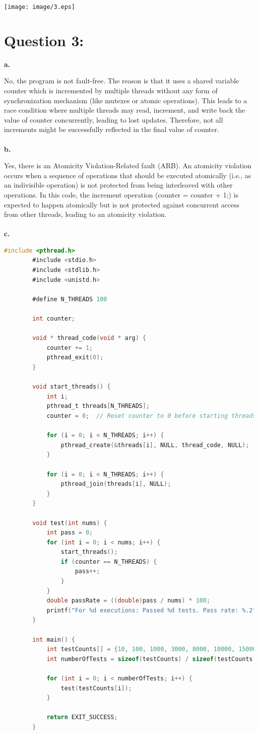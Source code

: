 \documentclass[12pt]{article}
\numberwithin{table}{section}
\begin{document}
	\begin{center}
		\texttt{[image: image/3.eps]}
	\end{center}
	
	
	\section*{Question 3: } 
	\textbf{a.}
	
	No, the program is not fault-free. The reason is that it uses a shared variable counter which is incremented by multiple threads without any form of synchronization mechanism (like mutexes or atomic operations). This leads to a race condition where multiple threads may read, increment, and write back the value of counter concurrently, leading to lost updates. Therefore, not all increments might be successfully reflected in the final value of counter.\\
	\\
	\textbf{b.}
	
	Yes, there is an Atomicity Violation-Related fault (ARB). An atomicity violation occurs when a sequence of operations that should be executed atomically (i.e., as an indivisible operation) is not protected from being interleaved with other operations. In this code, the increment operation (counter = counter + 1;) is expected to happen atomically but is not protected against concurrent access from other threads, leading to an atomicity violation.\\
	\\
	\textbf{c.}
	
	\begin{lstlisting}[language=C]
		#include <pthread.h>
		#include <stdio.h>
		#include <stdlib.h>
		#include <unistd.h>
		
		#define N_THREADS 100
		
		int counter;
		
		void * thread_code(void * arg) {
			counter += 1;
			pthread_exit(0);
		}
		
		void start_threads() {
			int i;
			pthread_t threads[N_THREADS];
			counter = 0;  // Reset counter to 0 before starting threads
			
			for (i = 0; i < N_THREADS; i++) {
				pthread_create(&threads[i], NULL, thread_code, NULL);
			}
			
			for (i = 0; i < N_THREADS; i++) {
				pthread_join(threads[i], NULL);
			}
		}
		
		void test(int nums) {
			int pass = 0;
			for (int i = 0; i < nums; i++) {
				start_threads();
				if (counter == N_THREADS) {
					pass++;
				}
			}
			double passRate = ((double)pass / nums) * 100;
			printf("For %d executions: Passed %d tests. Pass rate: %.2f%%\n", nums, pass, passRate);
		}
		
		int main() {
			int testCounts[] = {10, 100, 1000, 3000, 8000, 10000, 15000};
			int numberOfTests = sizeof(testCounts) / sizeof(testCounts[0]);
			
			for (int i = 0; i < numberOfTests; i++) {
				test(testCounts[i]);
			}
			
			return EXIT_SUCCESS;
		}\end{lstlisting} 
	
\end{document}
